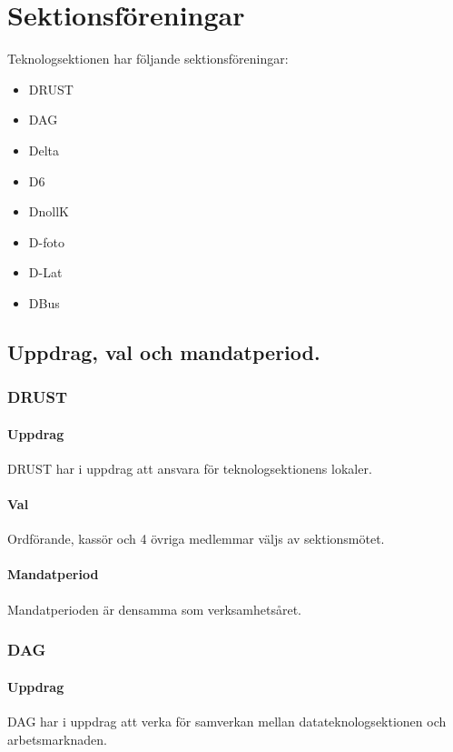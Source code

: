 \section{Sektionsföreningar}

Teknologsektionen har följande sektionsföreningar: 
\begin{itemize}
  \item DRUST 
  \item DAG 
  \item Delta 
  \item D6 
  \item DnollK
  \item D-foto
  \item D-Lat
  \item DBus
\end{itemize}

\subsection{Uppdrag, val och mandatperiod.}

\subsubsection{DRUST} 

\paragraph{Uppdrag}
DRUST har i uppdrag att ansvara för teknologsektionens lokaler.

\paragraph{Val}
Ordförande, kassör och 4 övriga medlemmar väljs av sektionsmötet. 

\paragraph{Mandatperiod}
Mandatperioden är densamma som verksamhetsåret. 

\subsubsection{DAG}

\paragraph{Uppdrag} 
DAG har i uppdrag att verka för samverkan mellan datateknologsektionen och arbetsmarknaden. 

